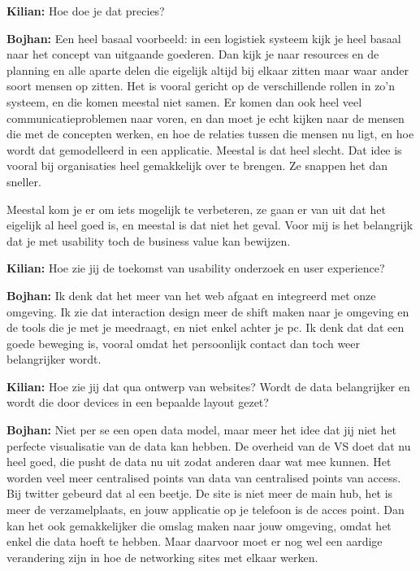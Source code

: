 \textbf{Kilian:} Hoe doe je dat precies?

\textbf{Bojhan:} Een heel basaal voorbeeld: in een logistiek systeem kijk je heel basaal naar het concept van uitgaande goederen. Dan kijk je naar resources en de planning en alle aparte delen die eigelijk altijd bij elkaar zitten maar waar ander soort mensen op zitten. Het is vooral gericht op de verschillende rollen in zo'n systeem, en die komen meestal niet samen. Er komen dan ook heel veel communicatieproblemen naar voren, en dan moet je echt kijken naar de mensen die met de concepten werken, en hoe de relaties tussen die mensen nu ligt, en hoe wordt dat gemodelleerd in een applicatie. Meestal is dat heel slecht. Dat idee is vooral bij organisaties heel gemakkelijk over te brengen. Ze snappen het dan sneller.

Meestal kom je er om iets mogelijk te verbeteren, ze gaan er van uit dat het eigelijk al heel goed is, en meestal is dat niet het geval. Voor mij is het belangrijk dat je met usability toch de business value kan bewijzen.

\textbf{Kilian:} Hoe zie jij de toekomst van usability onderzoek en user experience?

\textbf{Bojhan:} Ik denk dat het meer van het web afgaat en integreerd met onze omgeving. Ik zie dat interaction design meer de shift maken naar je omgeving en de tools die je met je meedraagt, en niet enkel achter je pc. Ik denk dat dat een goede beweging is, vooral omdat het persoonlijk contact dan toch weer belangrijker wordt.

\textbf{Kilian:} Hoe zie jij dat qua ontwerp van websites? Wordt de data belangrijker en wordt die door devices in een bepaalde layout gezet?

\textbf{Bojhan:} Niet per se een open data model, maar meer het idee dat jij niet het perfecte visualisatie van de data kan hebben. De overheid van de VS doet dat nu heel goed, die pusht de data nu uit zodat anderen daar wat mee kunnen. Het worden veel meer centralised points van data van centralised points van access. Bij twitter gebeurd dat al een beetje. De site is niet meer de main hub, het is meer de verzamelplaats, en jouw applicatie op je telefoon is de acces point. Dan kan het ook gemakkelijker die omslag maken naar jouw omgeving, omdat het enkel die data hoeft te hebben. Maar daarvoor moet er nog wel een aardige verandering zijn in hoe de networking sites met elkaar werken.


